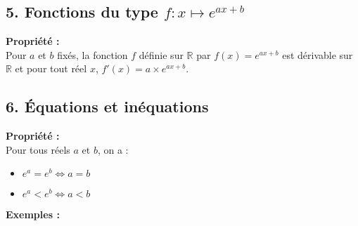 \documentclass[11pt,a4paper]{article}
\begin{document}
\newpage

\subsection*{5. Fonctions du type $f:x\mapsto e^{ax+b}$}

\begin{mdframed}[style=proprieteStyle]
    \textbf{Propriété :} ~\\
    Pour $a$ et $b$ fixés, la fonction $f$ définie sur $\mathbb{R}$ par $f(x)=e^{ax+b}$ est dérivable sur $\mathbb{R}$ et pour tout réel $x$, $f'(x)=a\times e^{ax+b}$.
\end{mdframed}


\subsection*{6. Équations et inéquations}

\begin{mdframed}[style=proprieteStyle]
    \textbf{Propriété :} ~\\
    Pour tous réels $a$ et $b$, on a :
    \vspace{-4pt}
    \begin{itemize}
        \item $e^a=e^b \Leftrightarrow a=b$
        \item $e^a<e^b \Leftrightarrow a<b$
    \end{itemize}
\end{mdframed}

\textbf{Exemples :} ~\\
\end{document}
